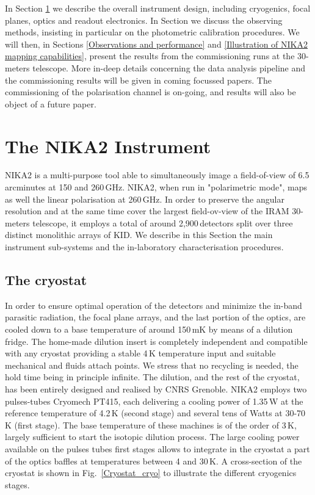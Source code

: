 \documentclass[]{aa} %
\begin{document}
In Section \ref{The NIKA2 Instrument} we describe the overall instrument design, including cryogenics, focal planes, optics and readout electronics. In Section \label{Measurement principle} we discuss the observing methods, insisting in particular on the photometric calibration procedures. We will then, in Sections \ref{Observations and performance} and \ref{Illustration of NIKA2 mapping capabilities}, present the results from the commissioning runs at the 30-meters telescope. More in-deep details concerning the data analysis pipeline and the commissioning results will be given in coming focussed papers. The commissioning of the polarisation channel is on-going, and results will also be object of a future paper.


\section{The NIKA2 Instrument}
\label{The NIKA2 Instrument}

NIKA2 is a multi-purpose tool able to simultaneously image a field-of-view of 6.5\,arcminutes at 150 and 260\,GHz. NIKA2, when run in "polarimetric mode", maps as well the linear polarisation  at 260\,GHz. In order to preserve the angular resolution and at the same time cover the largest field-ov-view of the IRAM 30-meters telescope, it employs a total of around 2,900\,detectors split over three distinct monolithic arrays of KID. We describe in this Section the main instrument sub-systems and the in-laboratory characterisation procedures.

 \subsection{The cryostat}

In order to ensure optimal operation of the detectors and minimize the in-band parasitic radiation, the focal plane arrays, and the last portion of the optics, are cooled down to a base temperature of around 150\,mK by means of a dilution fridge. The home-made dilution insert is completely independent and compatible with any cryostat providing a stable 4\,K temperature input and suitable mechanical and fluids attach points. We stress that no recycling is needed, the hold time being in principle infinite. The dilution, and the rest of the cryostat, has been entirely designed and realised by CNRS Grenoble. NIKA2 employs two pulses-tubes Cryomech PT415, each delivering a cooling power of 1.35\,W at the reference temperature of 4.2\,K (second stage) and several tens of Watts at 30-70\,K (first stage). The base temperature of these machines is of the order of 3\,K, largely sufficient to start the isotopic dilution process. The large cooling power available on the pulses tubes first stages allows to integrate in the cryostat a part of the optics baffles at temperatures between 4 and 30\,K. A cross-section of the cryostat is shown in Fig.~\ref{Cryostat_cryo} to illustrate the different cryogenics stages.
\end{document}
